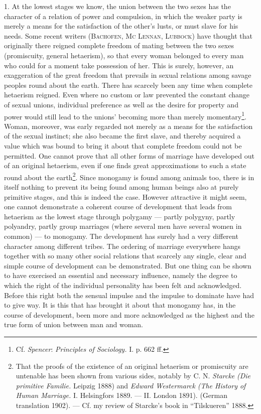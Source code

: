 \documentclass[12pt,a4paper,openany]{book}
\newcommand{\opage}[1]{\marginnote{\footnotesize\textit{[#1]}}}
\begin{document}
1. At the lowest stages we know, the union between the two sexes has the character of a relation of power and
compulsion, in which the
\opage{282}weaker party is merely a means for the satisfaction of the other's lusts, or must slave for his needs. Some
recent writers (\textsc{Bachofen}, \textsc{Mc Lennan}, \textsc{Lubbock}) have thought that originally there reigned
complete freedom of mating between the two sexes (promiscuity, general hetaerism), so that every woman belonged to every
man who could for a moment take possession of her. This is surely, however, an exaggeration of the great freedom that
prevails in sexual relations among savage peoples round about the earth. There has scarcely been any time when complete
hetaerism reigned. Even where no custom or law prevented the constant change of sexual unions, individual preference as
well as the desire for property and power would still lead to the unions' becoming more than merely
momentary\footnote[1]{Cf. \emph{Spencer}: \textit{Principles of Sociology.} I. p. 662 ff.}. Woman, moreover, was early
regarded not merely as a means for the satisfaction of the sexual instinct; she also became the first slave, and
thereby acquired a value which was bound to bring it about that complete freedom could not be permitted. One cannot
prove that all other forms of marriage have developed out of an original hetaerism, even if one finds great
approximations to such a state round about the earth\footnote[2]{That the proofs of the existence of an original
hetaerism or promiscuity are untenable has been shown from various sides, notably by C. N. \emph{Starcke} \textit{(Die
primitive Familie.} Leipzig 1888) and \emph{Edward Westermarck} \textit{(The History of Human Marriage.} I. Helsingfors
1889. --- II. London 1891). (German translation 1902). --- Cf. my review of Starcke's book in ``Tilskueren'' 1888.}.
Since monogamy is found among animals too, there is in itself nothing to prevent its being found among human beings
also at purely primitive stages, and this is indeed the case. However attractive it might seem, one cannot demonstrate
a coherent course of development that leads from hetaerism as the lowest stage through polygamy --- partly polygyny,
partly polyandry, partly group marriages (where several men have several women in common) --- to monogamy. The
development has surely had a very different character among different tribes. The ordering of marriage everywhere hangs
together with so many other social relations that scarcely any single, clear and simple course of development can be
demonstrated.
\opage{283}But one thing can be shown to have exercised an essential and necessary influence, namely the degree to which
the right of the individual personality has been felt and acknowledged. Before this right both the sensual impulse and
the impulse to dominate have had to give way. It is this that has brought it about that monogamy has, in the course of
development, been more and more acknowledged as the highest and the true form of union between man and woman.
\end{document}
